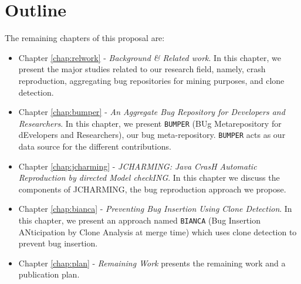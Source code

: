 \section{Outline\label{sec:outline}}

The remaining chapters of this proposal are:

\begin{itemize}
	\item Chapter \ref{chap:relwork} - {\it Background \& Related work}.
	In this chapter, we present the major studies related to our research field, namely, crash reproduction, aggregating bug repositories for mining purposes, and clone detection.

	\item Chapter \ref{chap:bumper} - {\it An Aggregate Bug Repository for Developers and Researchers}.
	In this chapter, we present {\tt BUMPER} (BUg Metarepository for  dEvelopers  and  Researchers), our bug meta-repository. {\tt BUMPER} acts as our data source for the different contributions.

	\item Chapter \ref{chap:jcharming} - {\it JCHARMING: Java CrasH Automatic Reproduction by directed Model checkING}.
	In this chapter we discuss the components of JCHARMING, the bug reproduction approach we propose.

	\item Chapter \ref{chap:bianca} - {\it Preventing Bug Insertion Using Clone Detection}. In this chapter, we present an approach named {\tt BIANCA} (Bug Insertion ANticipation by Clone Analysis at merge time) which uses clone detection to prevent bug insertion.

	\item Chapter \ref{chap:plan} - {\it Remaining Work} presents  the remaining work and a publication plan.
\end{itemize}
